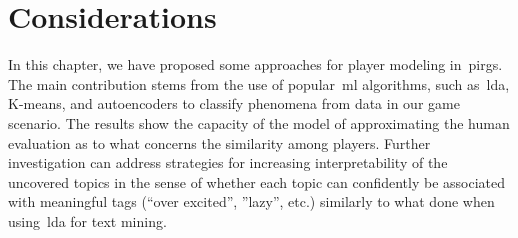 \section{Considerations}
In this chapter, we have proposed some approaches for player modeling in~\gls{pirg}s. The main contribution stems from the use of popular~\gls{ml} algorithms, such as~\gls{lda}, K-means, and autoencoders to classify phenomena from data in our game scenario. The results show the capacity of the model of approximating the human evaluation as to what concerns the similarity among players. Further investigation can address strategies for increasing interpretability of the uncovered topics in the sense of whether each topic can confidently be associated with meaningful tags (\eg ``over excited'', ''lazy'', etc.) similarly to what done when using~\gls{lda} for text mining.